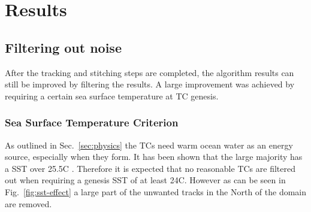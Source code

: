 \chapter{Results}\label{sec:results}

\section{Filtering out noise}
After the tracking and stitching steps are completed, the algorithm results can
still be improved by filtering the results. A large improvement was
achieved by requiring a certain sea surface temperature at TC genesis.
\subsection*{Sea Surface Temperature Criterion}
As outlined in Sec.~\ref{sec:physics} the TCs need warm ocean water as an
energy source, especially when they form. It has been shown that the large
majority has a SST over 25.5\degree C \cite{sst-paper}. Therefore it is
expected that no reasonable TCs are filtered out when requiring a genesis SST
of at least 24\degree C. However as can be seen in Fig.~\ref{fig:sst-effect}
a large part of the unwanted tracks in the North of the domain are removed.
